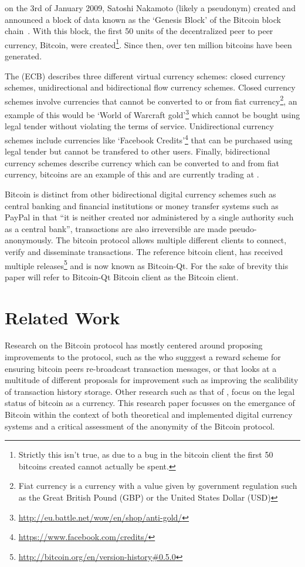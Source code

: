  on the 3rd of January 2009, Satoshi Nakamoto (likely a pseudonym) created and announced a block of data known as the `Genesis Block' of the Bitcoin block chain~\cite{satoshi}. With this block, the first 50 units of the decentralized peer to peer currency, Bitcoin, were created\footnote{Strictly this isn't true, as due to a bug in the bitcoin client the first 50 bitcoins created cannot actually be spent.}. Since then, over ten million bitcoins have been generated.

The \textcite{euro-currency-schemes} (ECB) describes three different virtual currency schemes: closed currency schemes, unidirectional and bidirectional flow currency schemes.  Closed currency schemes involve currencies that cannot be converted to or from fiat currency\footnote{Fiat currency is a currency with a value given by government regulation such as the Great British Pound (GBP) or the United States Dollar (USD)}, an example of this would be `World of Warcraft gold'\footnote{\url{http://eu.battle.net/wow/en/shop/anti-gold/}} which cannot be bought using legal tender without violating the terms of service.  Unidirectional currency schemes include currencies like `Facebook Credits'\footnote{\url{https://www.facebook.com/credits/}} that can be purchased using legal tender but cannot be transfered to other users.  Finally, bidirectional currency schemes describe currency which can be converted to and from fiat currency, bitcoins are an example of this and are currently trading at .

Bitcoin is distinct from other bidirectional digital currency schemes such as central banking and financial institutions or money transfer systems such as PayPal\cite{paypal} in that ``it is neither created nor administered by a single authority such as a central bank''\cite{why-interesting}, transactions are also irreversible are made pseudo-anonymously. The bitcoin protocol allows multiple different clients to connect, verify and disseminate transactions.  The reference bitcoin client, has received multiple releases\footnote{\url{http://bitcoin.org/en/version-history\#0.5.0}} and is now known as Bitcoin-Qt\cite{bitcoin-qt}. For the sake of brevity this paper will refer to Bitcoin-Qt Bitcoin client as the Bitcoin client.

\section{Related Work}
Research on the Bitcoin protocol has mostly centered around proposing improvements to the protocol, such as the \textcite{red-balloons} who sugggest a reward scheme for ensuring bitcoin peers re-broadcast transaction messages, or \textcite{bitter-to-better} that looks at a multitude of different proposals for improvement such as improving the scalibility of transaction history storage.  Other research such as that of \textcite{legal}, focus on the legal status of bitcoin as a currency.  This research paper focusses on the emergance of Bitcoin  within the context of both theoretical and implemented digital currency systems and a critical assessment of the anonymity of the Bitcoin protocol.

